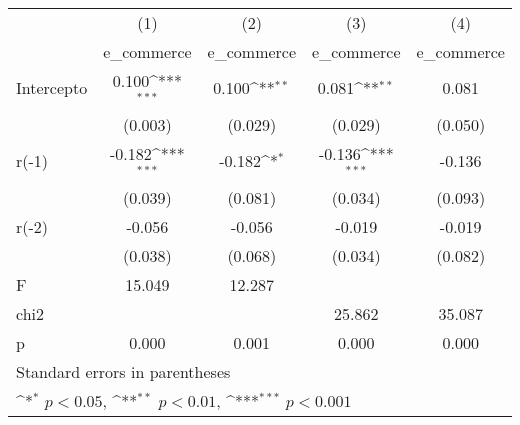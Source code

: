 {
\def\sym#1{\ifmmode^{#1}\else\(^{#1}\)\fi}
\begin{longtable}{l*{4}{c}}
\hline\hline\endfirsthead\hline\endhead\hline\endfoot\endlastfoot
            &\multicolumn{1}{c}{(1)}&\multicolumn{1}{c}{(2)}&\multicolumn{1}{c}{(3)}&\multicolumn{1}{c}{(4)}\\
            &\multicolumn{1}{c}{e\_commerce}&\multicolumn{1}{c}{e\_commerce}&\multicolumn{1}{c}{e\_commerce}&\multicolumn{1}{c}{e\_commerce}\\
\hline
Intercepto  &       0.100\sym{***}&       0.100\sym{**} &       0.081\sym{**} &       0.081         \\
            &     (0.003)         &     (0.029)         &     (0.029)         &     (0.050)         \\
r(-1)       &      -0.182\sym{***}&      -0.182\sym{*}  &      -0.136\sym{***}&      -0.136         \\
            &     (0.039)         &     (0.081)         &     (0.034)         &     (0.093)         \\
r(-2)       &      -0.056         &      -0.056         &      -0.019         &      -0.019         \\
            &     (0.038)         &     (0.068)         &     (0.034)         &     (0.082)         \\
\hline
F           &      15.049         &      12.287         &                     &                     \\
chi2        &                     &                     &      25.862         &      35.087         \\
p           &       0.000         &       0.001         &       0.000         &       0.000         \\
\hline\hline
\multicolumn{5}{l}{\footnotesize Standard errors in parentheses}\\
\multicolumn{5}{l}{\footnotesize \sym{*} \(p<0.05\), \sym{**} \(p<0.01\), \sym{***} \(p<0.001\)}\\
\end{longtable}
}
